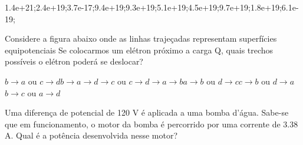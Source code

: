\documentclass[12pt, addpoints]{exam}
\begin{document}
\begin{questions}
\begin{multicols*}{2}
\begin{oneparchoices}
\choice 1.4e+21;\choice 2.4e+19;\choice 3.7e-17;\choice 9.4e+19;\choice 9.3e+19;\choice 5.1e+19;\choice 4.5e+19;\choice 9.7e+19;\choice 1.8e+19;\choice 6.1e-19;\end{oneparchoices}
\question[20] Considere a figura abaixo onde as linhas trajeçadas representam superfícies equipotenciais Se colocarmos um elétron próximo a carga Q, quais trechos possíveis o elétron poderá se deslocar?
        
        \begin{center}
            \begin{minipage}[c]{0.5\linewidth}
            \end{minipage}
        \end{center}
        
        

\begin{choices}
\choice $b\rightarrow a$ ou $c\rightarrow d$\choice $b\rightarrow a\rightarrow d\rightarrow c$ ou $c\rightarrow d\rightarrow a\rightarrow b$\choice $a\rightarrow b$ ou $d\rightarrow c$\choice $c\rightarrow b$ ou $d\rightarrow a$\choice $b\rightarrow c$ ou $a\rightarrow d$\end{choices}
\question[20] Uma diferença de potencial de 120 V é aplicada a uma bomba d’água. Sabe-se que em funcionamento, o motor da bomba é percorrido por uma corrente de    3.38 A. Qual é a potência desenvolvida nesse motor?


\end{multicols*}
\end{questions}
\end{document}
